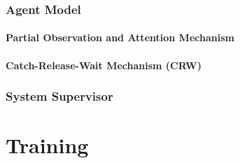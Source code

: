 \documentclass{article}
\begin{document}

	        \subsubsection{Agent Model}

                \paragraph{Partial Observation and Attention Mechanism}


                \paragraph{Catch-Release-Wait Mechanism (CRW)}

            \subsubsection{System Supervisor}

	\section{Training}
\end{document}
